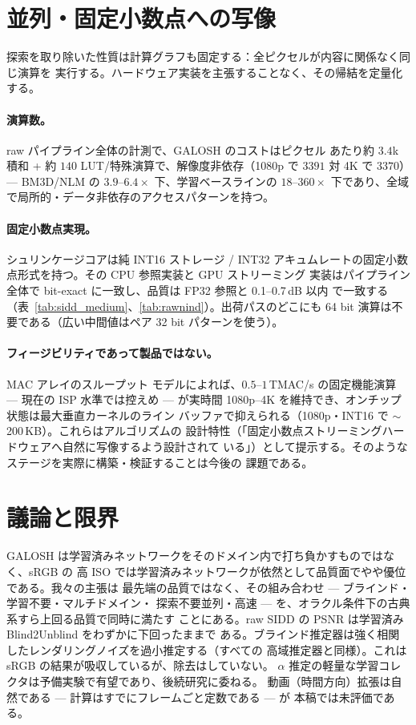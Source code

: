 \documentclass[10pt,twocolumn]{article}
\begin{document}
\section{並列・固定小数点への写像}\label{sec:map}
探索を取り除いた性質は計算グラフも固定する：全ピクセルが内容に関係なく同じ演算を
実行する。ハードウェア実装を主張することなく、その帰結を定量化する。

\paragraph{演算数。} raw パイプライン全体の計測で、GALOSH のコストはピクセル
あたり約 $3.4$k 積和 + 約 $140$ LUT/特殊演算で、解像度非依存（1080p で $3391$
対 4K で $3370$）--- BM3D/NLM の $3.9$--$6.4\times$ 下、学習ベースラインの
$18$--$360\times$ 下であり、全域で局所的・データ非依存のアクセスパターンを持つ。

\paragraph{固定小数点実現。} シュリンケージコアは純 INT16 ストレージ / INT32
アキュムレートの固定小数点形式を持つ。その CPU 参照実装と GPU ストリーミング
実装はパイプライン全体で bit-exact に一致し、品質は FP32 参照と 0.1--0.7\,dB 以内
で一致する（表~\ref{tab:sidd_medium}、\ref{tab:rawnind}）。出荷パスのどこにも
64 bit 演算は不要である（広い中間値はペア 32 bit パターンを使う）。

\paragraph{フィージビリティであって製品ではない。} MAC アレイのスループット
モデルによれば、$0.5$--$1$\,TMAC/s の固定機能演算 --- 現在の ISP 水準では控えめ
--- が実時間 1080p--4K を維持でき、オンチップ状態は最大垂直カーネルのライン
バッファで抑えられる（1080p・INT16 で $\sim$200\,KB）。これらはアルゴリズムの
設計特性（「固定小数点ストリーミングハードウェアへ自然に写像するよう設計されて
いる」）として提示する。そのようなステージを実際に構築・検証することは今後の
課題である。

\section{議論と限界}
GALOSH は学習済みネットワークをそのドメイン内で打ち負かすものではなく、sRGB の
高 ISO では学習済みネットワークが依然として品質面でやや優位である。我々の主張は
最先端の品質ではなく、その組み合わせ --- ブラインド・学習不要・マルチドメイン・
探索不要並列・高速 --- を、オラクル条件下の古典系すら上回る品質で同時に満たす
ことにある。raw SIDD の PSNR は学習済み Blind2Unblind をわずかに下回ったままで
ある。ブラインド推定器は強く相関したレンダリングノイズを過小推定する（すべての
高域推定器と同様）。これは sRGB の結果が吸収しているが、除去はしていない。
$\alpha$ 推定の軽量な学習コレクタは予備実験で有望であり、後続研究に委ねる。
動画（時間方向）拡張は自然である --- 計算はすでにフレームごと定数である --- が
本稿では未評価である。
\end{document}
